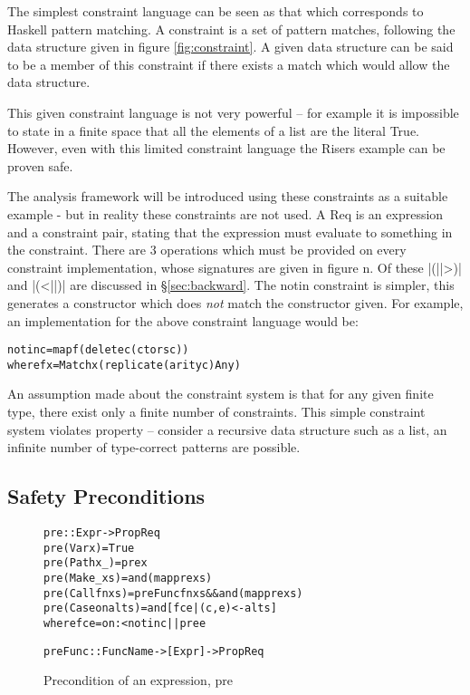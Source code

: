 \documentclass[preprint]{sigplanconf}
\newcommand{\C}[1]{\textsf{#1}}
\newenvironment{code}{\begin{alltt}\small}{\end{alltt}}
\begin{document}
The simplest constraint language can be seen as that which corresponds to Haskell pattern matching. A constraint is a set of pattern matches, following the data structure given in figure \ref{fig:constraint}. A given data structure can be said to be a member of this constraint if there exists a match which would allow the data structure.

This given constraint language is not very powerful -- for example it is impossible to state in a finite space that all the elements of a list are the literal True. However, even with this limited constraint language the Risers example can be proven safe.

The analysis framework will be introduced using these constraints as a suitable example - but in  reality these constraints are not used. A Req is an expression and a constraint pair, stating that the expression must evaluate to something in the constraint. There are 3 operations which must be provided on every constraint implementation, whose signatures are given in figure n. Of these |(||>)| and |(<||)| are discussed in \S\ref{sec:backward}. The \C{notin} constraint is simpler, this generates a constructor which does \textit{not} match the constructor given. For example, an implementation for the above constraint language would be:

\begin{code}
notin c = map f (delete c (ctors c))
   where f x = Match x (replicate (arity c) Any)
\end{code}

An assumption made about the constraint system is that for any given finite type, there exist only a finite number of constraints. This simple constraint system violates property -- consider a recursive data structure such as a list, an infinite number of type-correct patterns are possible.

\subsection{Safety Preconditions}

\begin{figure}
\begin{code}
pre :: Expr -> Prop Req
pre (Var   x         ) = True
pre (Path  x   _     ) = pre x
pre (Make  _   xs    ) = and (map pre xs)
pre (Call  fn  xs    ) = preFunc fn xs && and (map pre xs)
pre (Case  on  alts  ) = and [f c e | (c,e) <- alts]
    where f c e = on :< notin c || pre e

preFunc :: FuncName -> [Expr] -> Prop Req
\end{code}
\caption{Precondition of an expression, \C{pre}}
\label{fig:precondition}
\end{figure}
\end{document}
